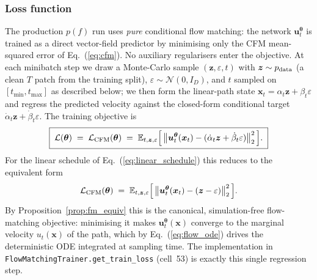 \documentclass[11pt]{article}
\newcommand{\EE}{\mathbb{E}}
\newcommand{\e}{\varepsilon}
\DeclareRobustCommand{\uvec}{\bm{u}}
\DeclareRobustCommand{\xvec}{\bm{x}}
\DeclareRobustCommand{\zvec}{\bm{z}}
\DeclareRobustCommand{\thetavec}{\bm{\theta}}
\newcommand{\pdata}{p_{\rm data}}
\theoremstyle{definition}
\begin{document}
\subsubsection{Loss function}

The production $p(f)$ run uses \emph{pure} conditional flow matching: the network $\uvec_t^{\thetavec}$ is trained as a direct vector-field predictor by minimising only the CFM mean-squared error of Eq.~(\ref{eq:cfm}). No auxiliary regularisers enter the objective. At each minibatch step we draw a Monte-Carlo sample $(\zvec,\e,t)$ with $\zvec\sim\pdata$ (a clean $T$ patch from the training split), $\e\sim\mathcal N(0,I_D)$, and $t$ sampled on $[t_{\min},t_{\max}]$ as described below; we then form the linear-path state $\xvec_t=\alpha_t\zvec+\beta_t\e$ and regress the predicted velocity against the closed-form conditional target $\dot\alpha_t\zvec+\dot\beta_t\e$. The training objective is
\begin{equation}
  \boxed{\;
  \mathcal L(\thetavec)
  \;=\;
  \mathcal L_{\rm CFM}(\thetavec)
  \;=\;
  \EE_{t,\zvec,\e}\Bigl[\,\bigl\|\uvec_t^{\thetavec}(\xvec_t)
                  - (\dot\alpha_t\zvec+\dot\beta_t\e)\bigr\|^2_2\,\Bigr].
  \;}
  \label{eq:total_loss}
\end{equation}
For the linear schedule of Eq.~(\ref{eq:linear_schedule}) this reduces to the equivalent form
\begin{equation}
  \mathcal L_{\rm CFM}(\thetavec)
  \;=\;
  \EE_{t,\zvec,\e}\Bigl[\,\bigl\|\uvec_t^{\thetavec}(\xvec_t)
                  - (\zvec-\e)\bigr\|^2_2\,\Bigr].
  \label{eq:cfm_linear}
\end{equation}
By Proposition~\ref{prop:fm_equiv} this is the canonical, simulation-free flow-matching objective: minimising it makes $\uvec_t^{\thetavec}(\xvec)$ converge to the marginal velocity $u_t(\xvec)$ of the path, which by Eq.~(\ref{eq:flow_ode}) drives the deterministic ODE integrated at sampling time. The implementation in \texttt{FlowMatchingTrainer.get\_train\_loss} (cell~53) is exactly this single regression step.
\end{document}
